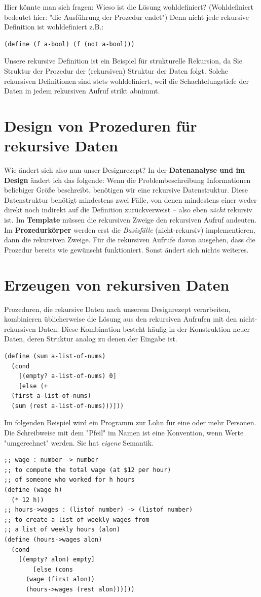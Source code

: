 Hier könnte man sich fragen: Wieso ist die Lösung wohldefiniert? (Wohldefiniert bedeutet hier: "die Ausführung der Prozedur endet") Denn nicht jede rekursive Definition ist wohldefiniert z.B.:
\begin{lstlisting}
(define (f a-bool) (f (not a-bool)))
\end{lstlisting}
Unsere rekursive Definition ist ein Beispiel für strukturelle
Rekursion, da Sie Struktur der Prozedur der (rekursiven) Struktur der Daten folgt. Solche rekursiven Definitionen sind stets wohldefiniert, weil die Schachtelungstiefe der Daten in jedem rekursiven Aufruf strikt abnimmt.

\section{Design von Prozeduren für rekursive Daten}
Wie ändert sich also nun unser Designrezept? In der \textbf{Datenanalyse und im Design} ändert ich das folgende: Wenn die Problembeschreibung Informationen beliebiger Größe beschreibt, benötigen wir eine rekursive Datenstruktur. Diese Datenstruktur benötigt mindestens zwei Fälle, von denen mindestens einer weder direkt noch indirekt auf die Definition zurückverweist – also eben \textit{nicht} rekursiv ist. Im \textbf{Template} müssen die rekursiven Zweige den rekursiven Aufruf andeuten. Im \textbf{Prozedurkörper} werden erst die \textit{Basisfälle} (nicht-rekursiv) implementieren, dann die rekursiven Zweige. Für die rekursiven Aufrufe davon ausgehen, dass die Prozedur bereits wie gewünscht funktioniert. Sonst ändert sich nichts weiteres.

\section{Erzeugen von rekursiven Daten}
Prozeduren, die rekursive Daten nach unserem Designrezept verarbeiten, kombinieren üblicherweise die Lösung aus den rekursiven Aufrufen mit den nicht-rekursiven Daten. Diese Kombination besteht häufig in der Konstruktion neuer Daten, deren Struktur analog zu denen der Eingabe ist.
\begin{lstlisting}
(define (sum a-list-of-nums)
  (cond
    [(empty? a-list-of-nums) 0]
    [else (+
  (first a-list-of-nums)
  (sum (rest a-list-of-nums)))]))
\end{lstlisting}

Im folgenden Beispiel wird ein Programm zur Lohn für eine oder mehr Personen. Die Schreibweise mit dem "Pfeil" im Namen ist eine Konvention, wenn Werte "umgerechnet" werden. Sie hat \textit{eigene} Semantik.
\begin{lstlisting}
;; wage : number -> number
;; to compute the total wage (at $12 per hour)
;; of someone who worked for h hours
(define (wage h)
  (* 12 h))
;; hours->wages : (listof number) -> (listof number)
;; to create a list of weekly wages from
;; a list of weekly hours (alon)
(define (hours->wages alon)
  (cond
    [(empty? alon) empty]
		[else (cons
      (wage (first alon))
      (hours->wages (rest alon)))]))
\end{lstlisting}

